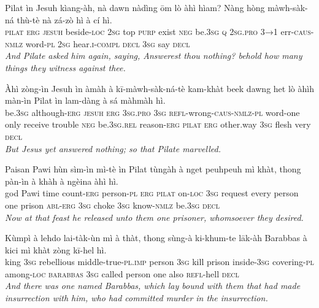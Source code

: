 \documentclass[11pt,a4paper]{article}
\begin{document}
\begin{exe}
\gll Pilat ìn Jesuh kìang-àh, nà dawn nàdìng ōm lò àhì hìam? Nàng hòng màwh-sàk-ná thù-tè nà zá-zò hì à cí hì. \\
     \textsc{pilat} \textsc{erg} \textsc{jesuh} beside-\textsc{loc} \textsc{2sg} top \textsc{purp} exist \textsc{neg} be.\textsc{3sg} \textsc{q} \textsc{2sg}.\textsc{pro} \textsc{3→1} err-\textsc{caus}-\textsc{nmlz} word-\textsc{pl} \textsc{2sg} hear.\textsc{i}-\textsc{compl} \textsc{decl} \textsc{3sg} say \textsc{decl} \\
\glt \textcolor{kjvcolor}{\textit{And Pilate asked him again, saying, Answerest thou nothing? behold how many things they witness against thee.}}

\gll Àhì zòng-ìn Jesuh ìn àmàh à kī-màwh-sàk-ná-tè kam-khàt beek dawng het lò àhìh màn-ìn Pilat ìn lam-dàng à sá màhmàh hì. \\
     be.\textsc{3sg} although-\textsc{erg} \textsc{jesuh} \textsc{erg} \textsc{3sg}.\textsc{pro} \textsc{3sg} \textsc{refl}-wrong-\textsc{caus}-\textsc{nmlz}-\textsc{pl} word-one only receive trouble \textsc{neg} be.\textsc{3sg}.\textsc{rel} reason-\textsc{erg} \textsc{pilat} \textsc{erg} other.way \textsc{3sg} flesh very \textsc{decl} \\
\glt \textcolor{kjvcolor}{\textit{But Jesus yet answered nothing; so that Pilate marvelled.}}

\gll Paisan Pawi hùn sìm-ìn mì-tè ìn Pilat tùngàh à nget peuhpeuh mì khàt, thong pàn-ìn à khàh à ngèina àhì hì. \\
     god Pawi time count-\textsc{erg} person-\textsc{pl} \textsc{erg} \textsc{pilat} on-\textsc{loc} \textsc{3sg} request every person one prison \textsc{abl}-\textsc{erg} \textsc{3sg} choke \textsc{3sg} know-\textsc{nmlz} be.\textsc{3sg} \textsc{decl} \\
\glt \textcolor{kjvcolor}{\textit{Now at that feast he released unto them one prisoner, whomsoever they desired.}}

\gll Kùmpì à lehdo lai-tàk-ùn mì à thàt, thong sùng-à ki-khum-te lāk-àh Barabbas à kici mì khàt zòng kī-hel hì. \\
     king \textsc{3sg} rebellious middle-true-\textsc{pl}.\textsc{imp} person \textsc{3sg} kill prison inside-\textsc{3sg} covering-\textsc{pl} among-\textsc{loc} \textsc{barabbas} \textsc{3sg} called person one also \textsc{refl}-hell \textsc{decl} \\
\glt \textcolor{kjvcolor}{\textit{And there was one named Barabbas, which lay bound with them that had made insurrection with him, who had committed murder in the insurrection.}}


\end{exe}
\end{document}

